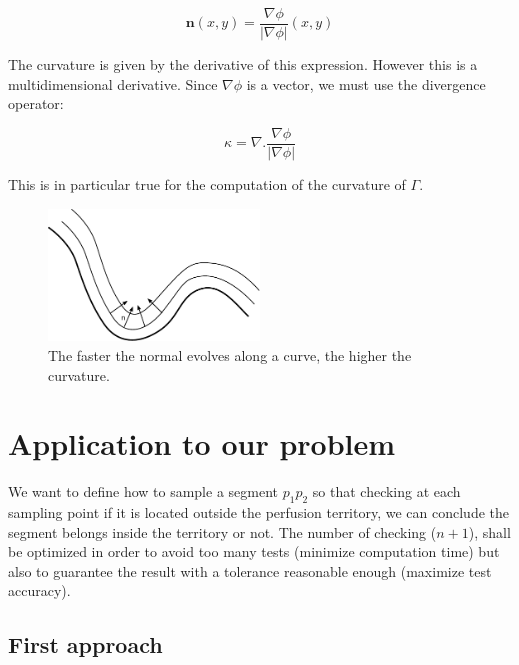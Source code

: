 \documentclass[11pt,a4paper]{article}
\begin{document}
	\begin{equation}
	\mathbf{n}(x,y) = \frac{\nabla \phi}{|\nabla \phi|}(x,y)
	\end{equation}
	
	The curvature is given by the derivative of this expression. However this is a multidimensional derivative. Since $\nabla \phi$ is a vector, we must use the divergence operator:
	
	\begin{equation}
	\kappa = \nabla . \frac{\nabla \phi}{|\nabla \phi|}
	\end{equation}
	
	This is in particular true for the computation of the curvature of $\Gamma$. 
	
		\begin{figure}
			\centering
			\includegraphics[width=0.5\textwidth]{Drawings/Distance.pdf}
			\caption{The faster the normal evolves along a curve, the higher the curvature.}
		\end{figure}
		
	\section{Application to our problem}
	
We want to define how to sample a segment $p_1p_2$ so that checking at each sampling point if it is located outside the perfusion territory, we can conclude the segment belongs inside the territory or not. The number of checking ($n + 1$), shall be optimized in order to avoid too many tests (minimize computation time) but also to guarantee the result with a tolerance reasonable enough (maximize test accuracy).

	\subsection{First approach} \label{firstaproach}
\end{document}
